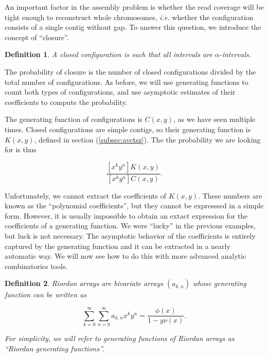 \documentclass{article}
\newtheorem{definition}{Definition}
\begin{document}
An important factor in the assembly problem is whether the read coverage
will be tight enough to reconstruct whole chromosomes, \textit{i.e.}
whether the configuration consists of a single contig without gap. To
answer this question, we introduce the concept of ``closure''.

\begin{definition}
\label{def:closure}
A closed configuration is such that all intervals are $\alpha$-intervals.
\end{definition}

The probability of closure is the number of closed configurations divided
by the total number of configurations. As before, we will use generating
functions to count both types of configurations, and use asymptotic
estimates of their coefficients to compute the probability.

The generating function of configurations is $C(x,y)$, as we have seen
multiple times. Closed configurations are simple contigs, so their
generating function is $K(x,y)$, defined in section (\ref{subsec:avctsz}).
The the probability we are looking for is thus

\begin{equation*}
\frac{[x^ky^n]K(x,y)}{[x^ky^n]C(x,y)}.
\end{equation*}

Unfortunately, we cannot extract the coefficients of $K(x,y)$. These
numbers are known as the ``polynomial coefficients'', but they cannot be
expresssed in a simple form. However, it is usually impossible to obtain
an extact expression for the coefficients of a generating function. We
were ``lucky'' in the previous examples, but luck is not necessary.  The
asymptotic behavior of the coefficients is entirely captured by the
generating function and it can be extracted in a nearly automatic way. We
will now see how to do this with more advanced analytic combinatorics
tools.

\begin{definition}
Riordan arrays are bivariate arrays $(a_{k,n})$ whose generating
function can be written as

\begin{equation}
\label{eq:RAGF}
\sum_{k=0}^\infty \sum_{n=0}^\infty a_{k,n} x^k y^n =
\frac{\phi(x)}{1-y \nu(x)}.
\end{equation}

For simplicity, we will refer to generating functions of Riordan arrays
as ``Riordan generating functions''.
\end{definition}
\end{document}
